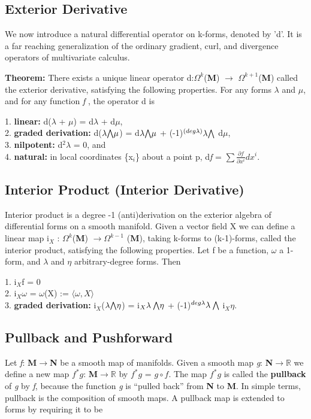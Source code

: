 \subsection{Exterior Derivative}
We now introduce a natural differential operator on k-forms, denoted by 'd'. 
It is a far reaching generalization of the ordinary gradient, curl, and divergence operators of multivariate calculus.

\textbf{Theorem: } There exists a unique linear operator d:$\Omega^k$(\textbf{M}) $\rightarrow$ $\Omega^{k+1}$(\textbf{M}) called the exterior derivative, satisfying the following properties. 
For any forms $\lambda$ and $\mu$, and for any function \textit{f} , the operator d is

1. \textbf{linear:} d($\lambda$ + $\mu$) = d$\lambda$ + d$\mu$,\\
2. \textbf{graded derivation:} d($\lambda \exterior \mu$) = d$\lambda \exterior \mu$ + (-1)$^{(deg \lambda)} \lambda \exterior$ d$\mu$,\\
3. \textbf{nilpotent:} d$^2 \lambda$ = 0, and \\
4. \textbf{natural:} in local coordinates \{x$_i$\} about a point p, d\textit{f} = $\sum \frac{\partial \textit{f}}{\partial x^i} dx^i$.

\subsection{Interior Product (Interior Derivative)}
Interior product is a degree -1 (anti)derivation on the exterior algebra of differential forms on a smooth manifold.
Given a vector field X we can define a linear map i$_X$ : $\Omega^k$(\textbf{M}) $\rightarrow \Omega^{k-1}$ (\textbf{M}), taking
k-forms to (k-1)-forms, called the interior product, satisfying the following
properties. Let f be a function, $\omega$ a 1-form, and $\lambda$ and $\eta$ arbitrary-degree forms. Then

1. i$_X$f = 0 \\
2. i$_X \omega$ = $\omega$(X) := $\langle \omega, X \rangle$ \\
3. \textbf{graded derivation:} i$_X$($\lambda \exterior \eta$) = i$_X \lambda \: \exterior \eta$ + (-1)$^{deg \lambda} \lambda \: \exterior$ i$_X \eta$.

\subsection{Pullback and Pushforward}
Let \textit{f}: \textbf{M}$\rightarrow$\textbf{N} be a smooth map of manifolds.  
Given a smooth map \textit{g}: \textbf{N}$\rightarrow \mathbb{R}$ we define a new map $f^*g$: \textbf{M}$\rightarrow \mathbb{R}$ by  $f^*g$ = $g\circ f$. 
The map $f^*g$ is called the \textbf{pullback} of \textit{g} by \textit{f}, because the function \textit{g} is “pulled back” from \textbf{N} to \textbf{M}.
In simple terms, pullback is the composition of smooth maps. 
A pullback map is extended to forms by requiring it to be

